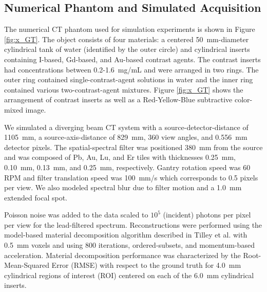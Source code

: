 \documentclass[12pt]{spieman}  %
\begin{document}
\begin{spacing}{1}
\vspace{-2mm}

\subsection{Numerical Phantom and Simulated Acquisition}

\vspace{-2mm}

The numerical CT phantom used for simulation experiments is shown in Figure \ref{fig:x_GT}. The object consists of four materials: a centered 50~mm-diameter cylindrical tank of water (identified by the outer circle) and cylindrical inserts containing I-based, Gd-based, and Au-based contrast agents. The contrast inserts had concentrations between 0.2-1.6~mg/mL and were arranged in two rings. The outer ring contained single-contrast-agent solutions in water and the inner ring contained various two-contrast-agent mixtures. Figure \ref{fig:x_GT} shows the arrangement of contrast inserts as well as a Red-Yellow-Blue subtractive color-mixed image.

We simulated a diverging beam CT system with a source-detector-distance of 1105~mm, a source-axis-distance of 829~mm, 360 view angles, and 0.556~mm detector pixels. The spatial-spectral filter was positioned 380~mm from the source and was composed of Pb, Au, Lu, and Er tiles with thicknesses 0.25~mm, 0.10~mm, 0.13~mm, and 0.25~mm, respectively. Gantry rotation speed was 60 RPM and filter translation speed was 100~mm/s which corresponds to 0.5 pixels per view. We also modeled spectral blur due to filter motion and a 1.0~mm extended focal spot.

Poisson noise was added to the data scaled to $10^5$ (incident) photons per pixel per view for the lead-filtered spectrum. Reconstructions were performed using the model-based material decomposition algorithm described in Tilley et al. \cite{tilley2018model} with 0.5~mm voxels and using 800 iterations, ordered-subsets, and momentum-based acceleration. Material decomposition performance was characterized by the Root-Mean-Squared Error (RMSE) with respect to the ground truth for 4.0~mm cylindrical regions of interest (ROI) centered on each of the 6.0~mm cylindrical inserts. 

\FloatBarrier



\end{spacing}
\end{document}
